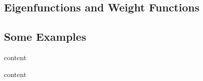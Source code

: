 \subsection{Eigenfunctions and Weight Functions}




\subsection{Some Examples}
\begin{example}
	content
\end{example}
\begin{example}
	content
\end{example}
